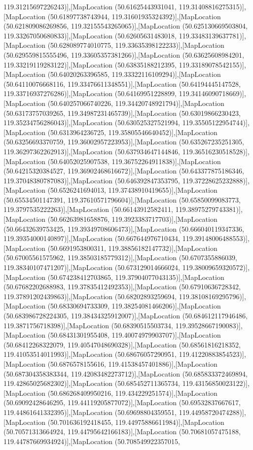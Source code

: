 119.31215697226243)],[MapLocation (50.61625443931041, 119.31408816275315)],[MapLocation (50.61897738743944, 119.31601935324392)],[MapLocation (50.621809086269856, 119.32155543265065)],[MapLocation (50.625130669503804, 119.33267050680833)],[MapLocation (50.62605631483018, 119.33483139637781)],[MapLocation (50.628089774010775, 119.33635398122233)],[MapLocation (50.629559815555496, 119.33605357381266)],[MapLocation (50.63625608984201, 119.33219119283122)],[MapLocation (50.63835188212395, 119.33189078542155)],[MapLocation (50.64020263396585, 119.33322116109294)],[MapLocation (50.64110076668116, 119.33476611348551)],[MapLocation (50.64194445147528, 119.33716937276286)],[MapLocation (50.64169951228899, 119.34146090718669)],[MapLocation (50.640257066740226, 119.34420748921794)],[MapLocation (50.63173757039265, 119.34987231465739)],[MapLocation (50.63019866230423, 119.35234756286043)],[MapLocation (50.630525327521994, 119.35505122954744)],[MapLocation (50.6313964236725, 119.35805546640452)],[MapLocation (50.63256693370759, 119.36002957223953)],[MapLocation (50.635267235251305, 119.36297362262913)],[MapLocation (50.637934647144846, 119.36516230518528)],[MapLocation (50.64052025907538, 119.36752264911838)],[MapLocation (50.64215320384527, 119.36902468616672)],[MapLocation (50.643377875186346, 119.37048380787083)],[MapLocation (50.646392847353795, 119.37228625232888)],[MapLocation (50.6526241694013, 119.37438910419655)],[MapLocation (50.65534501147391, 119.37610571796604)],[MapLocation (50.65850099083773, 119.3797535222263)],[MapLocation (50.66143912582411, 119.38975279743381)],[MapLocation (50.66263981658876, 119.3923383717703)],[MapLocation (50.66432639753425, 119.39349708606473)],[MapLocation (50.666040119347336, 119.39354000140897)],[MapLocation (50.667644976710434, 119.39148006488553)],[MapLocation (50.6691953800311, 119.38856182147732)],[MapLocation (50.67005561575962, 119.38503185779312)],[MapLocation (50.6707355886039, 119.38340107471207)],[MapLocation (50.673129014666024, 119.38009659320572)],[MapLocation (50.674238412703865, 119.37904077043135)],[MapLocation (50.67682202688983, 119.37835412492353)],[MapLocation (50.67910636728342, 119.37891202439863)],[MapLocation (50.68202893259694, 119.38108169295796)],[MapLocation (50.68330694733309, 119.38254081466206)],[MapLocation (50.683986728224305, 119.38434325912007)],[MapLocation (50.684612117946486, 119.3871756718398)],[MapLocation (50.68390515503734, 119.39528667190083)],[MapLocation (50.68431301955408, 119.40074979903707)],[MapLocation (50.68412268322079, 119.40547048690328)],[MapLocation (50.68561816218352, 119.41053514011993)],[MapLocation (50.68676057290951, 119.41220883854523)],[MapLocation (50.6876578155616, 119.41538457401886)],[MapLocation (50.687304358383344, 119.42083482273712)],[MapLocation (50.685833372469894, 119.42865025682302)],[MapLocation (50.685452711365734, 119.43156850023122)],[MapLocation (50.686268409950216, 119.434229251574)],[MapLocation (50.69092428646295, 119.44119205877072)],[MapLocation (50.69532837667617, 119.44861641332395)],[MapLocation (50.69698804359551, 119.44958720474288)],[MapLocation (50.701636192418455, 119.44975886611984)],[MapLocation (50.70571313664924, 119.44795642166183)],[MapLocation (50.70681057475188, 119.44787669934924)],[MapLocation (50.708549922357015, 